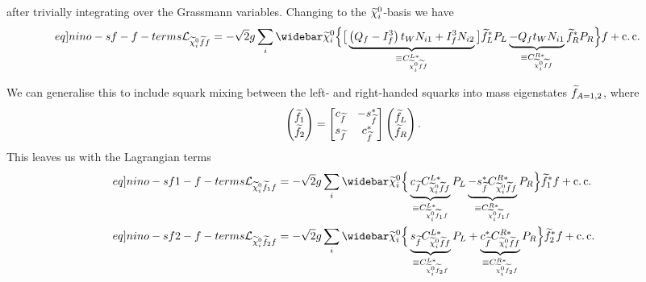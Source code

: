 \documentclass[english, notitlepage]{article}
\begin{document}
            after trivially integrating over the Grassmann variables.
            Changing to the $\nino[i]$-basis we have
            \begin{align}
                \label[eq]{nino-sf-f-terms}
                \L_{\nino[i]\wtilde{f}f} = -\sqrt{2} g   \sum_{i} \wbar{\wtilde{\chi}}^0_i & \Big\{ \big[ \underbrace{\pclosed{Q_f - I^3_f}t_W N_{i1}  + I^3_f N_{i2}}_{\equiv C_{\nino[i] \wtilde{f} f}^{L*}} \big] \wtilde{f}_L^* P_L \underbrace{- Q_f t_W N_{i1}}_{\equiv C_{\nino[i] \wtilde{f} f}^{R*}} \wtilde{f}_R^* P_R \Big\} f + \cc
            \end{align}

            We can generalise this to include squark mixing between the left- and right-handed squarks into mass eigenstates \(\wtilde{f}_{A=1,2}\), where
            \begin{align}
                \begin{pmatrix}
                    \wtilde{f}_1 \\
                    \wtilde{f}_2
                \end{pmatrix}
                =
                \begin{bmatrix}
                    c_{\wtilde{f}} & -s_{\wtilde{f}}^* \\
                    s_{\wtilde{f}} & c_{\wtilde{f}}^*
                \end{bmatrix} \begin{pmatrix}
                                  \wtilde{f}_L \\
                                  \wtilde{f}_R
                              \end{pmatrix}.
            \end{align}
            This leaves us with the Lagrangian terms
            \begin{subequations}
                \begin{align}
                    \label[eq]{nino-sf1-f-terms}
                    \L_{\nino[i] \wtilde{f}_1 f} = -\sqrt{2} g \sum_{i} \wbar{\wtilde{\chi}}^0_i & \Big\{ \underbrace{c_{\wtilde{f}} C_{\nino[i] \wtilde{f} f}^{L*}}_{\equiv C_{\nino[i] \wtilde{f}_1 f}^{L*}} P_L \underbrace{- s_{\wtilde{f}}^* C_{\nino[i] \wtilde{f} f}^{R*}}_{\equiv C_{\nino[i] \wtilde{f}_1 f}^{R*}} P_R \Big\} \wtilde{f}_1^* f + \cc \\
                    \label[eq]{nino-sf2-f-terms}
                    \L_{\nino[i] \wtilde{f}_2 f} = -\sqrt{2} g \sum_{i} \wbar{\wtilde{\chi}}^0_i & \Big\{ \underbrace{s_{\wtilde{f}} C_{\nino[i] \wtilde{f} f}^{L*}}_{\equiv C_{\nino[i] \wtilde{f}_2 f}^{L*}} P_L + \underbrace{c_{\wtilde{f}}^* C_{\nino[i] \wtilde{f} f}^{R*}}_{\equiv C_{\nino[i] \wtilde{f}_2 f}^{R*}} P_R \Big\} \wtilde{f}_2^* f + \cc
                \end{align}
            \end{subequations}
\end{document}
